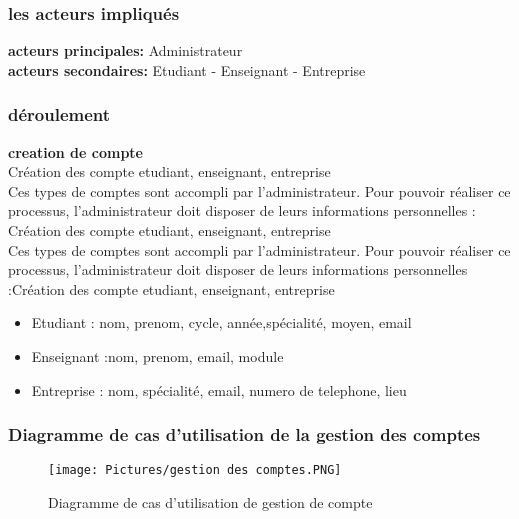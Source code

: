 \documentclass[11pt,fleqn]{book} %
\begin{document}
\subsubsection{les acteurs impliqués}
\textbf{acteurs principales: } Administrateur \\
 \textbf{acteurs secondaires: } Etudiant - Enseignant - Entreprise\\
\subsubsection{déroulement}

\hspace{0.5cm}\textbf{creation de compte}\\
Création des compte etudiant, enseignant, entreprise \\
Ces types de comptes sont accompli par l’administrateur. Pour pouvoir réaliser ce processus, l’administrateur doit disposer de leurs informations personnelles :
Création des compte etudiant, enseignant, entreprise \\
Ces types de comptes sont accompli par l’administrateur. Pour pouvoir réaliser ce processus, l’administrateur doit disposer de leurs informations personnelles :Création des compte etudiant, enseignant, entreprise \\

\begin{itemize}
    \item Etudiant : nom, prenom, cycle, année,spécialité, moyen, email 
    \item Enseignant :nom, prenom, email, module
    \item Entreprise : nom, spécialité, email, numero de telephone, lieu 
\end{itemize}
\subsubsection{Diagramme de cas d’utilisation de la gestion 
des comptes}

\begin{figure}[h]
    \centering
    \texttt{[image: Pictures/gestion des comptes.PNG]}
    \caption{Diagramme de cas d'utilisation de gestion de compte}
    \label{fig:pca}
\end{figure}
\end{document}
